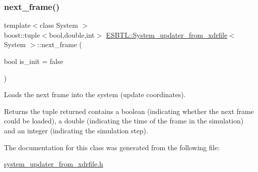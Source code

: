 \subsubsection{\texorpdfstring{next\+\_\+frame()}{next\_frame()}}
{\footnotesize\ttfamily template$<$class System $>$ \\
boost\+::tuple$<$bool,double,int$>$ \hyperlink{classESBTL_1_1System__updater__from__xdrfile}{E\+S\+B\+T\+L\+::\+System\+\_\+updater\+\_\+from\+\_\+xdrfile}$<$ System $>$\+::next\+\_\+frame (\begin{DoxyParamCaption}\item[{bool}]{is\+\_\+init = {\ttfamily false} }\end{DoxyParamCaption})\hspace{0.3cm}{\ttfamily [inline]}}

Loads the next frame into the system (update coordinates). \begin{DoxyReturn}{Returns}
the tuple returned contains a boolean (indicating whether the next frame could be loaded), a double (indicating the time of the frame in the simulation) and an integer (indicating the simulation step). 
\end{DoxyReturn}


The documentation for this class was generated from the following file\+:\begin{DoxyCompactItemize}
\item 
\hyperlink{system__updater__from__xdrfile_8h}{system\+\_\+updater\+\_\+from\+\_\+xdrfile.\+h}\end{DoxyCompactItemize}

